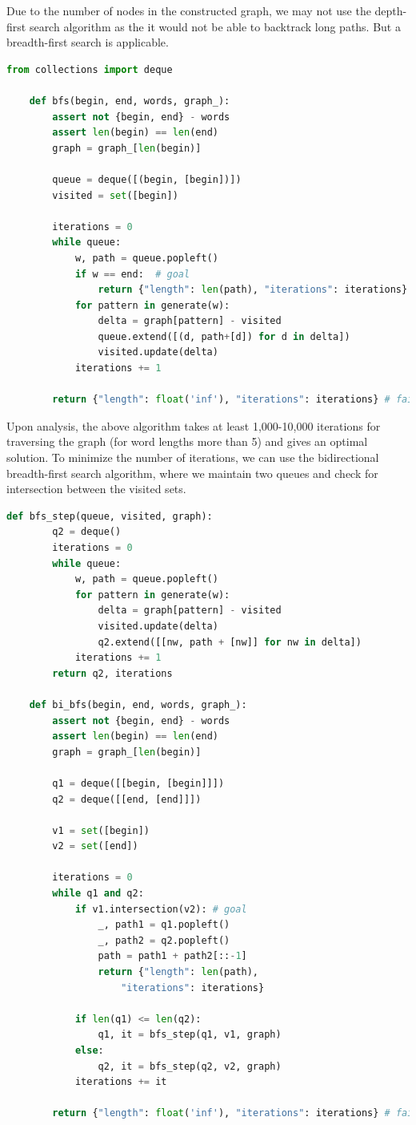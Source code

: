 \documentclass[]{article}
\begin{document}
Due to the number of nodes in the constructed graph, we may not use the depth-first search algorithm as the it would not be able to backtrack long paths. But a breadth-first search is applicable.

\begin{lstlisting}[language=Python]
	from collections import deque
	
	def bfs(begin, end, words, graph_):
		assert not {begin, end} - words
		assert len(begin) == len(end)
		graph = graph_[len(begin)]
		
		queue = deque([(begin, [begin])])
		visited = set([begin])
		
		iterations = 0
		while queue:
			w, path = queue.popleft()
			if w == end:  # goal
				return {"length": len(path), "iterations": iterations}
			for pattern in generate(w):
				delta = graph[pattern] - visited
				queue.extend([(d, path+[d]) for d in delta])
				visited.update(delta)
			iterations += 1
		
		return {"length": float('inf'), "iterations": iterations} # fail
\end{lstlisting}

Upon analysis, the above algorithm takes at least 1,000-10,000 iterations for traversing the graph (for word lengths more than 5) and gives an optimal solution. To minimize the number of iterations, we can use the bidirectional breadth-first search algorithm, where we maintain two queues and check for intersection between the visited sets.

\begin{lstlisting}[language=Python]
	def bfs_step(queue, visited, graph):
		q2 = deque()
		iterations = 0
		while queue:
			w, path = queue.popleft()
			for pattern in generate(w):
				delta = graph[pattern] - visited
				visited.update(delta)
				q2.extend([[nw, path + [nw]] for nw in delta])
			iterations += 1
		return q2, iterations
				
	def bi_bfs(begin, end, words, graph_):
		assert not {begin, end} - words
		assert len(begin) == len(end)
		graph = graph_[len(begin)]
	
		q1 = deque([[begin, [begin]]])
		q2 = deque([[end, [end]]])
	
		v1 = set([begin])
		v2 = set([end])
		
		iterations = 0
		while q1 and q2:
			if v1.intersection(v2): # goal
				_, path1 = q1.popleft()
				_, path2 = q2.popleft()
				path = path1 + path2[::-1]
				return {"length": len(path), 
					"iterations": iterations}
		
			if len(q1) <= len(q2):
				q1, it = bfs_step(q1, v1, graph)
			else:
				q2, it = bfs_step(q2, v2, graph)
			iterations += it
		
		return {"length": float('inf'), "iterations": iterations} # fail
\end{lstlisting}
\end{document}
